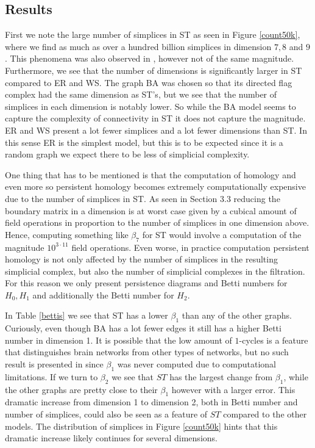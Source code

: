 \subsection{Results}
First we note the large number of simplices in ST as seen in Figure \ref{count50k}, where we find as much as over a hundred billion simplices in dimension $7,8$ and $9$. This phenomena was also observed in \cite{reimann}, however not of the same magnitude.  Furthermore, we see that the number of dimensions is significantly larger in ST compared to ER and WS. The graph BA was chosen so that its directed flag complex had the same dimension as ST's, but we see that the number of simplices in each dimension is notably lower. So while the BA model seems to capture the complexity of connectivity in ST it does not capture the magnitude. ER and WS present a lot fewer simplices and a lot fewer dimensions than ST. In this sense ER is the simplest model, but this is to be expected since it is a random graph we expect there to be less of simplicial complexity.

One thing that has to be mentioned is that the computation of homology and even more so persistent homology becomes extremely computationally expensive due to the number of simplices in ST. As seen in Section 3.3 reducing the boundary matrix in a dimension is at worst case given by a cubical amount of field operations in proportion to the number of simplices in one dimension above. Hence, computing something like $\beta_{7}$ for ST would involve a computation of the magnitude $10^{3 \cdot 11}$ field operations. Even worse, in practice computation persistent homology is not only affected by the number of simplices in the resulting simplicial complex, but also the number of simplicial complexes in the filtration. For this reason we only present persistence diagrams and Betti numbers for $H_{0},H_{1}$ and additionally the Betti number for $H_{2}$.

In Table \ref{bettis} we see that ST has a lower $\beta_{1}$ than any of the other graphs. Curiously, even though BA has a lot fewer edges it still has a higher Betti number in dimension 1. It is possible that the low amount of $1$-cycles is a feature that distinguishes brain networks from other types of networks, but no such result is presented in \cite{reimann} since $\beta_{1}$ was never computed due to computational limitations. If we turn to $\beta_{2}$ we see that $ST$ has the largest change from $\beta_{1}$, while the other graphs are pretty close to their $\beta_{1}$ however with a larger error. This dramatic increase from dimension 1 to dimension 2, both in Betti number and number of simplices, could also be seen as a feature of $ST$ compared to the other models. The distribution of simplices in Figure \ref{count50k} hints that this dramatic increase likely continues for several dimensions.

